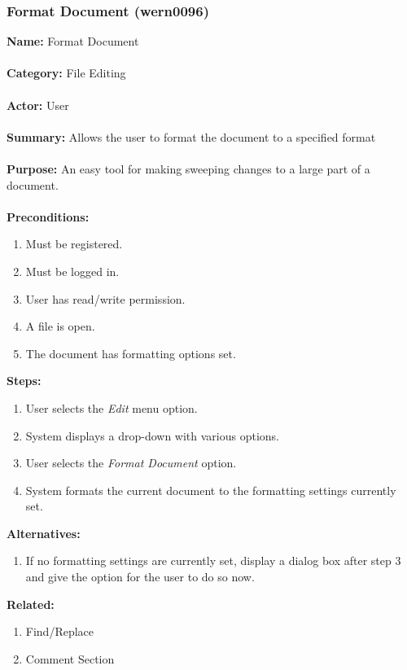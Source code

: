 \documentclass[11pt]{report}
\begin{document}
\subsubsection{Format Document (wern0096)}
\begin{framed}
	\noindent\textbf{Name:} Format Document \\ \\
	\textbf{Category:} File Editing \\ \\
	\textbf{Actor:} User \\ \\
	\textbf{Summary:} Allows the user to format the document to a specified format \\ \\
	\textbf{Purpose:} An easy tool for making sweeping changes to a large part of a document. \\ \\
	\textbf{Preconditions:} 
	\begin{enumerate}
		\item Must be registered.
		\item Must be logged in.
		\item User has read/write permission.
		\item A file is open.
		\item The document has formatting options set.
	\end{enumerate}
	\textbf{Steps:}
	\begin{enumerate}
		\item User selects the \textit{Edit} menu option.
		\item System displays a drop-down with various options.
		\item User selects the \textit{Format Document} option.
		\item System formats the current document to the formatting settings currently set.
	\end{enumerate}
	\textbf{Alternatives:}
	\begin{enumerate}
		\item If no formatting settings are currently set, display a dialog box after step 3 and give the option for the user to do so now.
	\end{enumerate}
	\textbf{Related:}
	\begin{enumerate}
		\item Find/Replace
		\item Comment Section
	\end{enumerate}
\end{framed}
\end{document}
